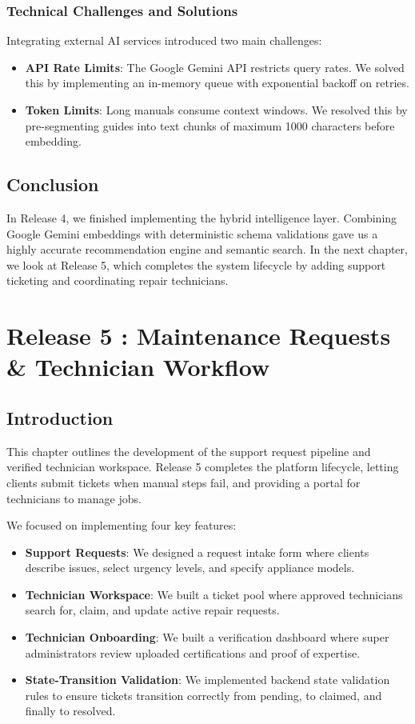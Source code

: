 \documentclass[12pt,a4paper]{report}
\begin{document}
\subsection{Technical Challenges and Solutions}

Integrating external AI services introduced two main challenges:
\begin{itemize}
    \item \textbf{API Rate Limits}: The Google Gemini API restricts query rates. We solved this by implementing an in-memory queue with exponential backoff on retries.
    \item \textbf{Token Limits}: Long manuals consume context windows. We resolved this by pre-segmenting guides into text chunks of maximum 1000 characters before embedding.
\end{itemize}

\section{Conclusion}

In Release 4, we finished implementing the hybrid intelligence layer. Combining Google Gemini embeddings with deterministic schema validations gave us a highly accurate recommendation engine and semantic search. In the next chapter, we look at Release 5, which completes the system lifecycle by adding support ticketing and coordinating repair technicians.

\chapter{Release 5 : Maintenance Requests \& Technician Workflow}

\section{Introduction}

This chapter outlines the development of the support request pipeline and verified technician workspace. Release 5 completes the platform lifecycle, letting clients submit tickets when manual steps fail, and providing a portal for technicians to manage jobs.

We focused on implementing four key features:
\begin{itemize}
    \item \textbf{Support Requests}: We designed a request intake form where clients describe issues, select urgency levels, and specify appliance models.
    \item \textbf{Technician Workspace}: We built a ticket pool where approved technicians search for, claim, and update active repair requests.
    \item \textbf{Technician Onboarding}: We built a verification dashboard where super administrators review uploaded certifications and proof of expertise.
    \item \textbf{State-Transition Validation}: We implemented backend state validation rules to ensure tickets transition correctly from pending, to claimed, and finally to resolved.
\end{itemize}
\end{document}
